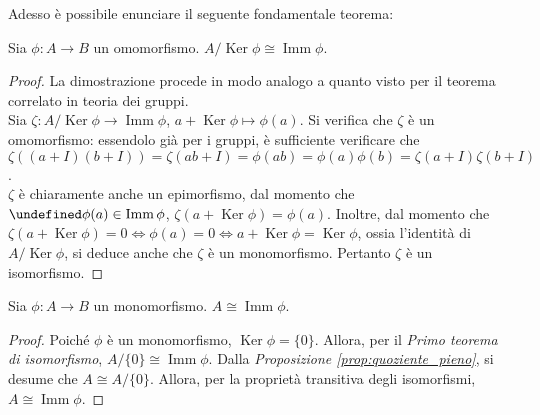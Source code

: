 \documentclass[a4paper]{article}
\DeclareMathOperator{\Ker}{Ker}
\DeclareMathOperator{\Imm}{Imm}
\let\oldforall\forall
\let\forall\undefined
\DeclareMathOperator{\forall}{\oldforall}
\begin{document}
Adesso è possibile enunciare il seguente fondamentale teorema:

\begin{theorem}
    \label{th:primo_isomorfismo}
    Sia $\phi : A \to B$ un omomorfismo. $A/\Ker \phi \cong \Imm \phi$.
\end{theorem}

\begin{proof}
    La dimostrazione procede in modo analogo a quanto visto per il teorema correlato
    in teoria dei gruppi. \\

    Sia $\zeta : A/\Ker \phi \to \Imm \phi$, $a + \Ker \phi \mapsto \phi(a)$.
    Si verifica che $\zeta$ è un omomorfismo: essendolo già per i
    gruppi, è sufficiente verificare che $\zeta((a+I)(b+I))=\zeta(ab+I)=\phi(ab)=\phi(a)\phi(b)=\zeta(a+I)\zeta(b+I)$. \\

    $\zeta$ è chiaramente anche un epimorfismo, dal momento che $\forall \phi(a) \in \Imm \phi$, $\zeta(a + \Ker \phi) = \phi(a)$. Inoltre, dal momento che $\zeta(a + \Ker \phi) = 0 \iff \phi(a) = 0 \iff a + \Ker \phi = \Ker \phi$, ossia l'identità di $A/\Ker \phi$, si deduce anche che $\zeta$ è un monomorfismo. Pertanto $\zeta$ è un isomorfismo.
\end{proof}

\begin{corollary}
    Sia $\phi : A \to B$ un monomorfismo. $A \cong \Imm \phi$.
\end{corollary}

\begin{proof}
    Poiché $\phi$ è un monomorfismo, $\Ker \phi = \{0\}$. Allora, per il \textit{Primo teorema di isomorfismo}, $A/\{0\} \cong \Imm \phi$. Dalla
    \textit{Proposizione \ref{prop:quoziente_pieno}}, si desume che $A \cong A/\{0\}$. Allora, per la proprietà transitiva degli isomorfismi, $A \cong \Imm \phi$.
\end{proof}
\end{document}
